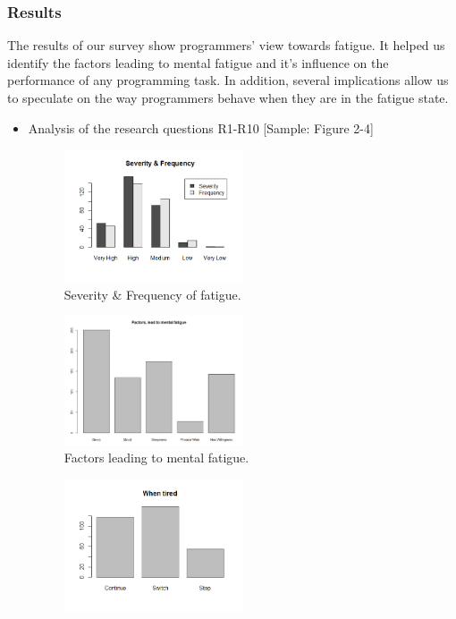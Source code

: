 \documentclass{acm_proc_article-sp}
\begin{document}
\subsubsection{Results}
The results of our survey show programmers' view towards fatigue. It helped
us identify the factors leading to mental fatigue and it's influence on the
performance of any programming task. In addition, several implications allow us
to speculate on the way programmers behave when they are in the fatigue state.
  \begin{itemize}
  \item Analysis of the research questions R1-R10 [Sample: Figure 2-4]
   \begin{figure}
	\centering
	\includegraphics[width=0.5\textwidth,natwidth=517,natheight=382]{sevFreq.png}
	\caption{Severity \& Frequency of fatigue.}
   \end{figure}
   \begin{figure}
	\centering
	\includegraphics[width=0.5\textwidth,natwidth=913,natheight=659]{factors.png}
	\caption{Factors leading to mental fatigue.}
   \end{figure}
   \begin{figure}
	\centering
	\includegraphics[width=0.5\textwidth,natwidth=517,natheight=382]{tired.png}

\end{figure}
\end{itemize}
\end{document}
